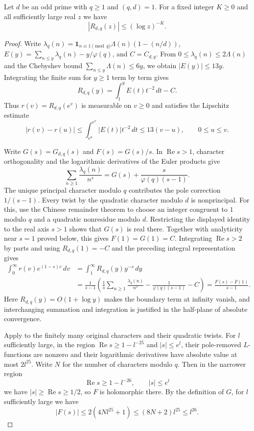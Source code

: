 \begin{lemma}
\label{lem:weighted-pnt}
\emitthmsource
Let $d$ be an odd prime with $q\ge1$ and $(q,d)=1$. For a fixed integer $K\ge0$ and all sufficiently large real $z$ we have
\[
 |R_{d,q}(z)|\le(\log z)^{-K}.
\]
\end{lemma}
\begin{proof}
Write $\lambda_q(n)=\mathbf 1_{n\equiv1\pmod q}\Lambda(n)(1-(n/d))$,
$E(y)=\sum_{n\le y}\lambda_q(n)-y/\varphi(q)$, and $C=C_{d,q}$. From
$0\le\lambda_q(n)\le2\Lambda(n)$ and the Chebyshev bound $\sum_{n\le y}\Lambda(n)\le6y$,
we obtain $|E(y)|\le13y$. Integrating the finite sum for $y\ge1$ term by term gives
\[
 R_{d,q}(y)=\int_1^y E(t)t^{-2}\,dt-C .
\]
Thus $r(v)=R_{d,q}(e^v)$ is measurable on $v\ge0$ and satisfies the Lipschitz estimate
\[
 |r(v)-r(u)|
 \le \int_{e^u}^{e^v}|E(t)|t^{-2}\,dt
 \le13(v-u),\qquad 0\le u\le v .
\]

Write $G(s)=G_{d,q}(s)$ and $F(s)=G(s)/s$. In $\operatorname{Re}s>1$, character orthogonality and the logarithmic derivatives of the Euler products give
\[
 \sum_{n\ge1}\frac{\lambda_q(n)}{n^s}
 =G(s)+\frac{s}{\varphi(q)(s-1)}.
\]
The unique principal character modulo $q$ contributes the pole correction $1/(s-1)$. Every twist by the quadratic character modulo $d$ is nonprincipal. For this, use the Chinese remainder theorem to choose an integer congruent to $1$ modulo $q$ and a quadratic nonresidue modulo $d$. Restricting the displayed identity to the real axis $s>1$ shows that $G(s)$ is real there. Together with analyticity near $s=1$ proved below, this gives $F(1)=G(1)=C$. Integrating $\operatorname{Re}s>2$ by parts and using $R_{d,q}(1)=-C$ and the preceding integral representation gives
\[
\begin{aligned}
 \int_0^\infty r(v)e^{(1-s)v}\,dv
 &=\int_1^\infty R_{d,q}(y)y^{-s}\,dy\\
 &=\frac{1}{s-1}\left(
 \frac{1}{s}\sum_{n\ge1}\frac{\lambda_q(n)}{n^s}
       -\frac{1}{\varphi(q)(s-1)}-C\right)
 =\frac{F(s)-F(1)}{s-1}.
\end{aligned}
\]
Here $R_{d,q}(y)=O(1+\log y)$ makes the boundary term at infinity vanish, and interchanging summation and integration is justified in the half-plane of absolute convergence.

Apply  to the finitely many original characters and their quadratic twists. For $l$ sufficiently large, in the region
$\operatorname{Re}s\ge1-l^{-25}$ and $|s|\le e^l$, their pole-removed $L$-functions are nonzero and their logarithmic derivatives have absolute value at most $2l^{25}$. Write $N$ for the number of characters modulo $q$. Then in the narrower region
\[
 \operatorname{Re}s\ge1-l^{-26},\qquad |s|\le e^l
\]
we have $|s|\ge\operatorname{Re}s\ge1/2$, so $F$ is holomorphic there. By the definition of $G$, for $l$ sufficiently large we have
\[
 |F(s)|\le 2(4Nl^{25}+1)\le (8N+2)l^{25}\le l^{26}.
\]


\end{proof}
